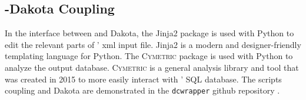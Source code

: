 \subsection{\Cyclus-Dakota Coupling}
In the interface between \Cyclus and Dakota, 
the Jinja2 \cite{ronacher_welcome_2018} package is used 
with Python to edit the relevant parts of \Cyclus' xml input file. 
Jinja2 is a modern and designer-friendly templating 
language for Python. 
The \textsc{Cymetric} \cite{scopatz_cymetric_2015} package is used with Python 
to analyze the \Cyclus output database. 
\textsc{Cymetric} is a general analysis library and tool that was 
created in 2015 to more easily interact with \Cyclus' SQL 
database. 
The scripts coupling \Cyclus and Dakota are demonstrated in the 
\texttt{dcwrapper} github repository \cite{ddwrapper_doi_2019}.




